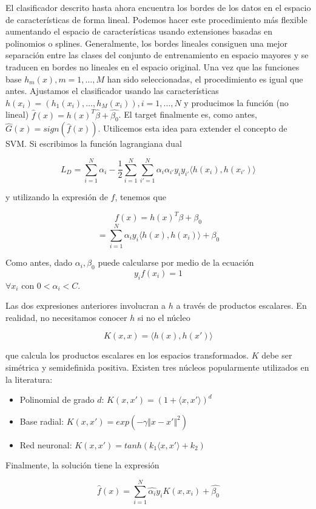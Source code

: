 El clasificador descrito hasta ahora encuentra los bordes de los datos en el espacio de características de forma lineal. Podemos hacer este procedimiento más flexible aumentando el espacio de características usando extensiones basadas en polinomios o splines. Generalmente, los bordes lineales consiguen una mejor separación entre las clases del conjunto de entrenamiento en espacio mayores y se traducen en bordes no lineales en el espacio original. Una vez que las funciones base $h_m(x), m=1,\dots,M$ han sido seleccionadas, el procedimiento es igual que antes. Ajustamos el clasificador usando las características $h(x_i) = (h_1(x_i),\dots,h_M(x_i)), i = 1, \dots, N$ y producimos la función (no lineal) $\hat{f}(x) = h(x)^T \hat{\beta} + \hat{\beta_0}$. El target finalmente es, como antes,  $\hat{G}(x)= sign(\hat{f}(x))$. Utilicemos esta idea para extender el concepto de SVM. Si escribimos la función lagrangiana dual 

$$L_D = \sum_{i=1}^{N}\alpha_i - \frac{1}{2}\sum_{i=1}^{N}\sum_{i'=1}^{N}\alpha_i \alpha_{i'} y_i y_{i'}\langle h(x_i),h(x_{i'})\rangle$$

y utilizando la expresión de $f$, tenemos que

$$f(x) = h(x)^T \beta + \beta_0$$
$$= \sum_{i=1}^{N} \alpha_i y_i \langle h(x),h(x_i) \rangle + \beta_0$$

Como antes, dado $\alpha_i, \beta_0$ puede calcularse por medio de la ecuación $$ y_i f(x_i) = 1$$ $\forall x_i \text{ con } 0 < \alpha_i < C$.

Las dos expresiones anteriores involucran a $h$ a través de productos escalares. En realidad, no necesitamos conocer $h$ si no el núcleo

$$K(x,x) = \langle h(x),h(x') \rangle$$

que calcula los productos escalares en los espacios transformados. $K$ debe ser simétrica y semidefinida positiva. Existen tres núcleos popularmente utilizados en la literatura:
\begin{itemize}
		\item Polinomial de grado $d$: $K(x,x') = (1+\langle x,x'\rangle) ^d$
		\item Base radial: $K(x,x') = exp(-\gamma \Vert x-x'\Vert^2)$
		\item Red neuronal: $K(x,x') = tanh(k_1 \langle x, x' \rangle + k_2)$
\end{itemize}

Finalmente, la solución tiene la expresión

$$\hat{f}(x) = \sum_{i=1}^{N} \hat{\alpha_i}y_i K(x,x_i)+\hat{\beta_0}$$

